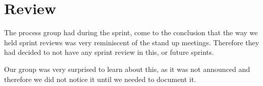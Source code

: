 \section{Review} \label{SEC:sprint3review}
The process group had during the sprint, come to the conclusion that the way we held sprint reviews was very reminiscent of the stand up meetings.
Therefore they had decided to not have any sprint review in this, or future sprints. 

Our group was very surprised to learn about this, as it was not announced and therefore we did not notice it until we needed to document it.
